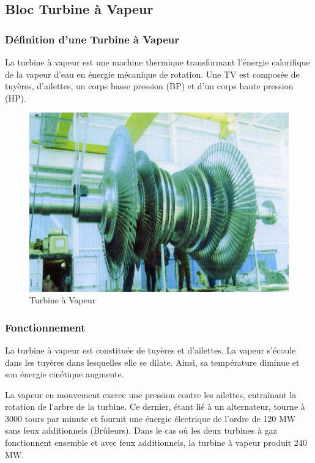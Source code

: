 \subsection{Bloc Turbine à Vapeur}
\subsubsection{Définition d'une Turbine à Vapeur}
La turbine à vapeur est une machine thermique transformant l'énergie calorifique de la vapeur d'eau en énergie mécanique de rotation. Une TV est composée de tuyères, d'ailettes, un corps basse pression (BP) et d'un corps haute pression (HP).
\begin{figure}[hbtp]
 \centering
 \includegraphics[scale=0.5]{./Figures/TV.png}
 \caption{Turbine à Vapeur}
 \end{figure}

\subsubsection{Fonctionnement} 
La turbine à vapeur est constituée de tuyères et d'ailettes. La vapeur s'écoule dans les tuyères dans lesquelles elle se dilate. Ainsi, sa température diminue et son énergie cinétique augmente.

La vapeur en mouvement exerce une pression contre les ailettes, entraînant la rotation de l'arbre de la turbine. 
Ce dernier, étant lié à un alternateur, tourne à 3000 tours par minute et fournit une énergie électrique de l'ordre de 120 MW sans feux additionnels (Brûleurs). Dans le cas où les deux turbines à gaz fonctionnent ensemble et avec feux additionnels, la turbine à vapeur produit 240 MW.

